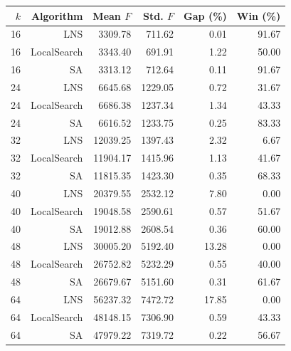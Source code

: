 \begin{tabular}{rrrrrr}
\toprule
$k$ & Algorithm & Mean $F$ & Std. $F$ & Gap (\%) & Win (\%) \\
\midrule
16 & LNS & 3309.78 & 711.62 & 0.01 & 91.67 \\
16 & LocalSearch & 3343.40 & 691.91 & 1.22 & 50.00 \\
16 & SA & 3313.12 & 712.64 & 0.11 & 91.67 \\
24 & LNS & 6645.68 & 1229.05 & 0.72 & 31.67 \\
24 & LocalSearch & 6686.38 & 1237.34 & 1.34 & 43.33 \\
24 & SA & 6616.52 & 1233.75 & 0.25 & 83.33 \\
32 & LNS & 12039.25 & 1397.43 & 2.32 & 6.67 \\
32 & LocalSearch & 11904.17 & 1415.96 & 1.13 & 41.67 \\
32 & SA & 11815.35 & 1423.30 & 0.35 & 68.33 \\
40 & LNS & 20379.55 & 2532.12 & 7.80 & 0.00 \\
40 & LocalSearch & 19048.58 & 2590.61 & 0.57 & 51.67 \\
40 & SA & 19012.88 & 2608.54 & 0.36 & 60.00 \\
48 & LNS & 30005.20 & 5192.40 & 13.28 & 0.00 \\
48 & LocalSearch & 26752.82 & 5232.29 & 0.55 & 40.00 \\
48 & SA & 26679.67 & 5151.60 & 0.31 & 61.67 \\
64 & LNS & 56237.32 & 7472.72 & 17.85 & 0.00 \\
64 & LocalSearch & 48148.15 & 7306.90 & 0.59 & 43.33 \\
64 & SA & 47979.22 & 7319.72 & 0.22 & 56.67 \\
\bottomrule
\end{tabular}
